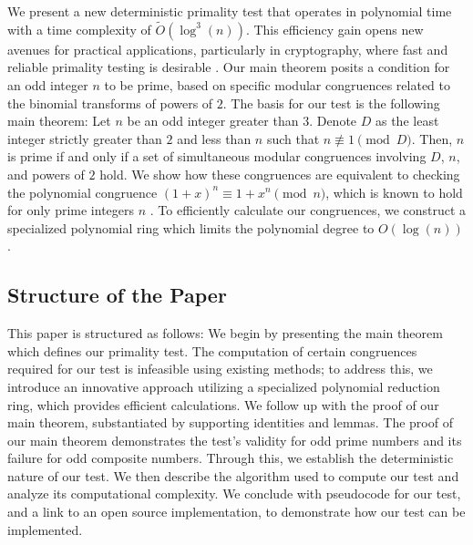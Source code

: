 \documentclass{article}
\theoremstyle{plain}
\theoremstyle{definition}
\begin{document}
We present a new deterministic primality test that operates in polynomial time with a time complexity of $\tilde{O}(\log^3(n))$. This efficiency gain opens new avenues for practical applications, particularly in cryptography, where fast and reliable primality testing is desirable \cite{pomerance1984}. Our main theorem posits a condition for an odd integer \( n \) to be prime, based on specific modular congruences related to the binomial transforms of powers of $2$. The basis for our test is the following main theorem: Let \( n \) be an odd integer greater than \(3\). Denote \( D \) as the least integer strictly greater than \( 2 \) and less than \( n \) such that $n \not\equiv 1 \pmod{D}$. Then, \( n \) is prime if and only if a set of simultaneous modular congruences involving \( D \), \( n \), and powers of $2$ hold. We show how these congruences are equivalent to checking the polynomial congruence $(1 + x)^n \equiv 1 + x^n \pmod{n}$, which is known to hold for only prime integers $n$ \cite{granville2004primes}. To efficiently calculate our congruences, we construct a specialized polynomial ring which limits the polynomial degree to $O(\log(n))$.

\subsection{Structure of the Paper}
This paper is structured as follows: We begin by presenting the main theorem which defines our primality test. The computation of certain congruences required for our test is infeasible using existing methods; to address this, we introduce an innovative approach utilizing a specialized polynomial reduction ring, which provides efficient calculations. We follow up with the proof of our main theorem, substantiated by supporting identities and lemmas. The proof of our main theorem demonstrates the test's validity for odd prime numbers and its failure for odd composite numbers. Through this, we establish the deterministic nature of our test. We then describe the algorithm used to compute our test and analyze its computational complexity. We conclude with pseudocode for our test, and a link to an open source implementation, to demonstrate how our test can be implemented.
\end{document}
